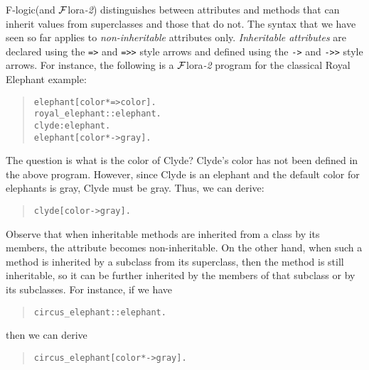 \documentclass[11pt]{article}
\newcommand{\FLORA}{{\mbox{${\cal F}${\sc lora}\rm\emph{-2}}}\xspace}
\newcommand{\fl}{\mbox{F-logic}\xspace}
\begin{document}
\fl (and \FLORA) distinguishes between attributes and methods that can
inherit values from superclasses and those that do not. The syntax that we
have seen so far applies to \emph{non-inheritable} attributes only.
\emph{Inheritable attributes} are declared using the {\tt *=>} and {\tt *=>>}
style arrows and defined using the {\tt *->} and {\tt *->>} style arrows. For
instance, the following is a \FLORA program for the classical {\sf Royal
Elephant} example:
\begin{quote}
\begin{verbatim}
elephant[color*=>color].
royal_elephant::elephant.
clyde:elephant.
elephant[color*->gray].
\end{verbatim}
\end{quote}
The question is what is the color of {\sf Clyde}?
{\sf Clyde}'s color has not been defined in the above program. However, since
{\sf Clyde} is an elephant and the default color for elephants is gray, {\sf Clyde}
must be gray. Thus, we can derive:
\begin{quote}
\begin{verbatim}
clyde[color->gray].  
\end{verbatim}
\end{quote}
Observe that when inheritable methods are inherited from a class by its
members, the attribute becomes non-inheritable. On the other hand, when
such a method is inherited by a subclass from its superclass, then the
method is still inheritable, so it can be further inherited by the members
of that subclass or by its subclasses. For instance, if we have
\begin{quote}
\begin{verbatim}
circus_elephant::elephant.
\end{verbatim}
\end{quote}
then we can derive 
\begin{quote}
\begin{verbatim}
circus_elephant[color*->gray].  
\end{verbatim}
\end{quote}
\end{document}
